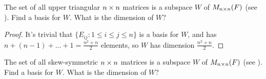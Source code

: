 \begin{exercise} \label{exercise 1.6.16}
The set of all upper triangular \(n \times n\) matrices is a subspace \(W\) of \(M_{n \times n}(F)\) (see ).
Find a basis for \(W\).
What is the dimension of \(W\)?
\end{exercise}

\begin{proof}
It's trivial that \(\{ E_{ij} : 1 \le i \le j \le n \}\) is a basis for \(W\), and has \(n + (n - 1) + ... + 1 = \frac{n^2 + n}{2}\) elements, so \(W\) has dimension \(\frac{n^2 + n}{2}\).
\end{proof}

\begin{exercise} \label{exercise 1.6.17}
The set of all skew-symmetric \(n \times n\) matrices is a subspace \(W\) of \(M_{n \times n}(F)\) (see ).
Find a basis for \(W\).
What is the dimension of \(W\)?
\end{exercise}

